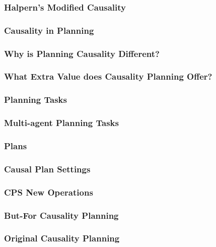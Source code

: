 \documentclass{beamer}
\begin{document}
\begin{frame}
\frametitle{Halpern's Modified Causality}

\end{frame}



\begin{frame}
\frametitle{Causality in Planning}

\end{frame}



\begin{frame}
\frametitle{Why is Planning Causality Different?}

\end{frame}


\begin{frame}
\frametitle{What Extra Value does Causality Planning Offer?}

\end{frame}


\begin{frame}
\frametitle{Planning Tasks}

\end{frame}


\begin{frame}
\frametitle{Multi-agent Planning Tasks}

\end{frame}


\begin{frame}
\frametitle{Plans}

\end{frame}


\begin{frame}
\frametitle{Causal Plan Settings}

\end{frame}



\begin{frame}
\frametitle{CPS New Operations}

\end{frame}


\begin{frame}
\frametitle{But-For Causality Planning}

\end{frame}


\begin{frame}
\frametitle{Original Causality Planning}

\end{frame}
\end{document}
